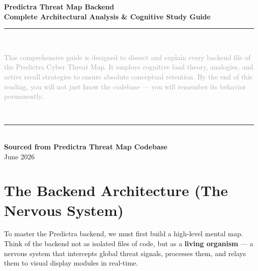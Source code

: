 \documentclass[11pt,a4paper]{report}
\begin{document}
\begin{titlepage}
  \centering
  \vspace*{2cm}
  {\Huge \bfseries \color{primary} Predictra Threat Map Backend} \\[0.5cm]
  {\Large \bfseries \color{secondary} Complete Architectural Analysis \& Cognitive Study Guide} \\[1.5cm]
  
  \rule{\textwidth}{1pt} \\[1.5cm]
  
  \begin{minipage}{0.8\textwidth}
    \centering
    \large \textcolor{darkgray}{
      This comprehensive guide is designed to dissect and explain every backend file of the Predictra Cyber Threat Map. It employs cognitive load theory, analogies, and active recall strategies to ensure absolute conceptual retention. By the end of this reading, you will not just know the codebase --- you will remember its behavior permanently.
    }
  \end{minipage} \\[1.5cm]
  
  \rule{\textwidth}{1pt} \\[2cm]
  
  {\large \bfseries Sourced from Predictra Threat Map Codebase} \\[0.2cm]
  {\large June 2026}
  
  \vfill
\end{titlepage}

\tableofcontents
\newpage

\chapter{The Backend Architecture (The Nervous System)}

To master the Predictra backend, we must first build a high-level mental map. Think of the backend not as isolated files of code, but as a \textbf{living organism} --- a nervous system that intercepts global threat signals, processes them, and relays them to visual display modules in real-time.
\end{document}

